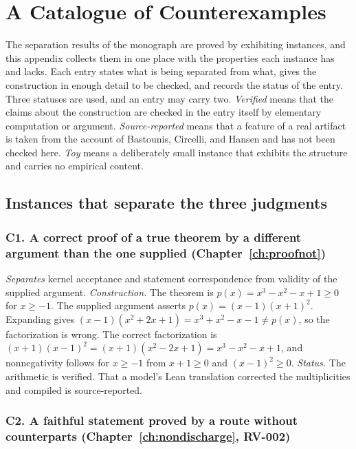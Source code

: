 \chapter{A Catalogue of Counterexamples}
\label{app:counterexamples}

The separation results of the monograph are proved by exhibiting instances, and this appendix collects them in one place with the properties each instance has and lacks. Each entry states what is being separated from what, gives the construction in enough detail to be checked, and records the status of the entry. Three statuses are used, and an entry may carry two. \emph{Verified} means that the claims about the construction are checked in the entry itself by elementary computation or argument. \emph{Source-reported} means that a feature of a real artifact is taken from the account of Bastounis, Circelli, and Hansen and has not been checked here. \emph{Toy} means a deliberately small instance that exhibits the structure and carries no empirical content.

\section{Instances that separate the three judgments}

\subsection*{C1. A correct proof of a true theorem by a different argument than the one supplied (Chapter~\ref{ch:proofnot})}

\emph{Separates} kernel acceptance and statement correspondence from validity of the supplied argument. \emph{Construction.} The theorem is $p(x)=x^3-x^2-x+1\ge0$ for $x\ge-1$. The supplied argument asserts $p(x)=(x-1)(x+1)^2$. Expanding gives $(x-1)(x^2+2x+1)=x^3+x^2-x-1\neq p(x)$, so the factorization is wrong. The correct factorization is $(x+1)(x-1)^2=(x+1)(x^2-2x+1)=x^3-x^2-x+1$, and nonnegativity follows for $x\ge-1$ from $x+1\ge0$ and $(x-1)^2\ge0$. \emph{Status.} The arithmetic is verified. That a model's Lean translation corrected the multiplicities and compiled is source-reported.

\subsection*{C2. A faithful statement proved by a route without counterparts (Chapter~\ref{ch:nondischarge}, RV-002)}

